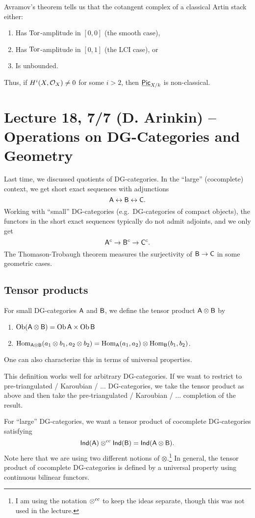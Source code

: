 \documentclass{amsart}
\begin{document}
Avramov's theorem tells us that the cotangent complex of a classical Artin stack either:
\begin{enumerate}
	\item Has $\operatorname{Tor}$-amplitude in $[0, 0]$ (the smooth case),
	\item Has $\operatorname{Tor}$-amplitude in $[0, 1]$ (the LCI case), or
	\item Is unbounded.
\end{enumerate}
Thus, if $H^i(X, \mathcal{O}_X) \neq 0$ for some $i > 2$, then $\underline{\mathsf{Pic}}_{X/k}$ is non-classical.

\section{Lecture 18, 7/7 (D. Arinkin) -- Operations on DG-Categories and Geometry}

Last time, we discussed quotients of DG-categories.
In the ``large'' (cocomplete) context, we get short exact sequences with adjunctions
\[
	\mathsf{A} \leftrightarrow \mathsf{B} \leftrightarrow \mathsf{C}.
\]
Working with ``small'' DG-categories (e.g.\ DG-categories of compact objects), the functors in the short exact sequences typically do not admit adjoints, and we only get
\[
	\mathsf{A}^c \to \mathsf{B}^c \to \mathsf{C}^c.
\]
The Thomason-Trobaugh theorem measures the surjectivity of $\mathsf{B} \to \mathsf{C}$ in some geometric cases.

\subsection{Tensor products}

For small DG-categories $\mathsf{A}$ and $\mathsf{B}$, we define the tensor product $\mathsf{A} \otimes \mathsf{B}$ by
\begin{enumerate}
	\item $\operatorname{Ob}(\mathsf{A} \otimes \mathsf{B}) = \operatorname{Ob} \mathsf{A} \times \operatorname{Ob} \mathsf{B}$
	\item $\operatorname{Hom}_{\mathsf{A} \otimes \mathsf{B}}(a_1 \otimes b_1, a_2 \otimes b_2) = \operatorname{Hom}_{\mathsf{A}}(a_1, a_2) \otimes \operatorname{Hom}_{\mathsf{B}}(b_1, b_2)$.
\end{enumerate}
One can also characterize this in terms of universal properties.

This definition works well for arbitrary DG-categories.
If we want to restrict to pre-triangulated / Karoubian / ... DG-categories, we take the tensor product as above and then take the pre-triangulated / Karoubian / ... completion of the result.

For ``large'' DG-categories, we want a tensor product of cocomplete DG-categories satisfying
\[
	\mathsf{Ind}(\mathsf{A}) \otimes^{\mathrm{cc}} \mathsf{Ind}(\mathsf{B}) = \mathsf{Ind}(\mathsf{A} \otimes \mathsf{B}).
\]
Note here that we are using two different notions of $\otimes$.\footnote{I am using the notation $\otimes^{\mathrm{cc}}$ to keep the ideas separate, though this was not used in the lecture.}
In general, the tensor product of cocomplete DG-categories is defined by a universal property using continuous bilinear functors.
\end{document}
